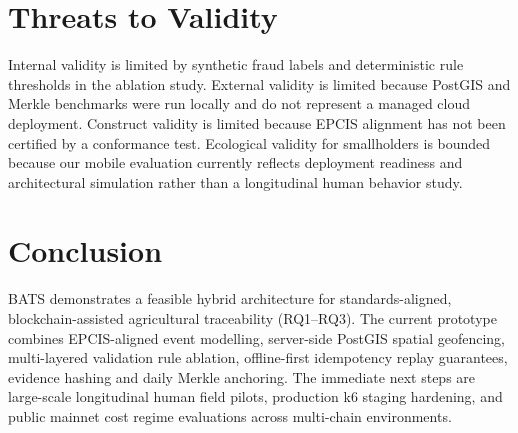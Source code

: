 \documentclass[runningheads]{llncs}
\begin{document}
\section{Threats to Validity}

Internal validity is limited by synthetic fraud labels and deterministic rule thresholds in the ablation study. External validity is limited because PostGIS and Merkle benchmarks were run locally and do not represent a managed cloud deployment. Construct validity is limited because EPCIS alignment has not been certified by a conformance test. Ecological validity for smallholders is bounded because our mobile evaluation currently reflects deployment readiness and architectural simulation rather than a longitudinal human behavior study.

\section{Conclusion}

BATS demonstrates a feasible hybrid architecture for standards-aligned, blockchain-assisted agricultural traceability (RQ1--RQ3). The current prototype combines EPCIS-aligned event modelling, server-side PostGIS spatial geofencing, multi-layered validation rule ablation, offline-first idempotency replay guarantees, evidence hashing and daily Merkle anchoring. The immediate next steps are large-scale longitudinal human field pilots, production k6 staging hardening, and public mainnet cost regime evaluations across multi-chain environments.



\end{document}
